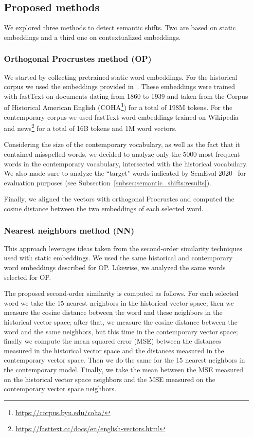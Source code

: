 \documentclass[runningheads]{llncs}
\begin{document}
\subsection{Proposed methods}
\label{subsec:semantic_shifts:methods}

We explored three methods to detect semantic shifts. Two are based on static embeddings and a third one on contextualized embeddings.

\subsubsection{Orthogonal Procrustes method (OP)} We started by collecting pretrained static word embeddings. For the historical corpus we used the embeddings provided in~\cite{sprugnoli-tonelli-2019-histo}. These embeddings were trained with fastText on documents dating from 1860 to 1939 and taken from the Corpus of Historical American English (COHA\footnote{\url{https://corpus.byu.edu/coha/}}) for a total of 198M tokens. For the contemporary corpus we used fastText word embeddings trained on Wikipedia and news\footnote{\url{https://fasttext.cc/docs/en/english-vectors.html}} for a total of 16B tokens and 1M word vectors.

Considering the size of the contemporary vocabulary, as well as the fact that it contained misspelled words, we decided to analyze only the 5000 most frequent words in the contemporary vocabulary, intersected with the historical vocabulary. We also made sure to analyze the “target" words indicated by SemEval-2020~\cite{schlechtweg-etal-2020-semeval} for evaluation purposes (see Subsection~\ref{subsec:semantic_shifts:results}).

Finally, we aligned the vectors with orthogonal Procrustes and computed the cosine distance between the two embeddings of each selected word.

\subsubsection{Nearest neighbors method (NN)} This approach leverages ideas taken from the second-order similarity techniques used with static embeddings. We used the same historical and contemporary word embeddings described for OP. Likewise, we analyzed the same words selected for OP.

The proposed second-order similarity is computed as follows. For each selected word we take the 15 nearest neighbors in the historical vector space; then we measure the cosine distance between the word and these neighbors in the historical vector space; after that, we measure the cosine distance between the word and the same neighbors, but this time in the contemporary vector space; finally we compute the mean squared error (MSE) between the distances measured in the historical vector space and the distances measured in the contemporary vector space. Then we do the same for the 15 nearest neighbors in the contemporary model. Finally, we take the mean between the MSE measured on the historical vector space neighbors and the MSE measured on the contemporary vector space neighbors. 
\end{document}
